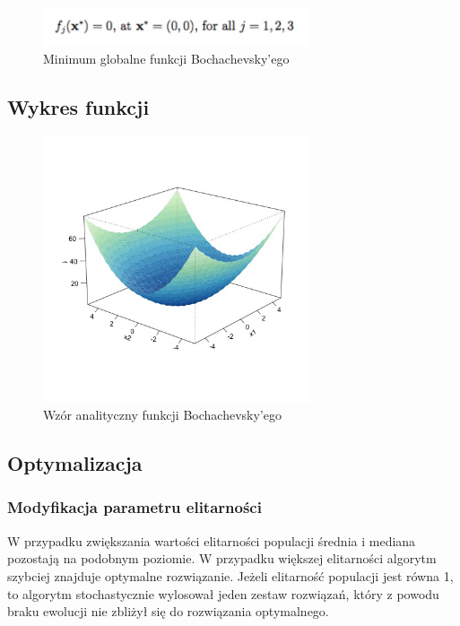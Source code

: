 \documentclass{article}
\begin{document}
    \begin{figure}[!htbp]
    \centering
    \includegraphics[width=0.7\textwidth]{inc/wzory/bohachevsky-global-minimum}
     \caption{Minimum globalne funkcji Bochachevsky'ego}
    \end{figure}
    
    \subsection{Wykres funkcji}
    \begin{figure}[!htbp]
    \centering
    \includegraphics[width=0.7\textwidth]{inc/wykresyfunkcji/bohachevsky}
     \caption{Wzór analityczny funkcji Bochachevsky'ego}
    \end{figure}
    
    \subsection{Optymalizacja}
\subsubsection{Modyfikacja parametru elitarności}    
W przypadku zwiększania wartości elitarności populacji średnia i mediana pozostają na podobnym poziomie. W przypadku większej elitarności algorytm szybciej znajduje optymalne rozwiązanie. Jeżeli elitarność populacji jest równa 1, to algorytm stochastycznie wylosował jeden zestaw rozwiązań, który z powodu braku ewolucji nie zbliżył się do rozwiązania optymalnego.
\end{document}

